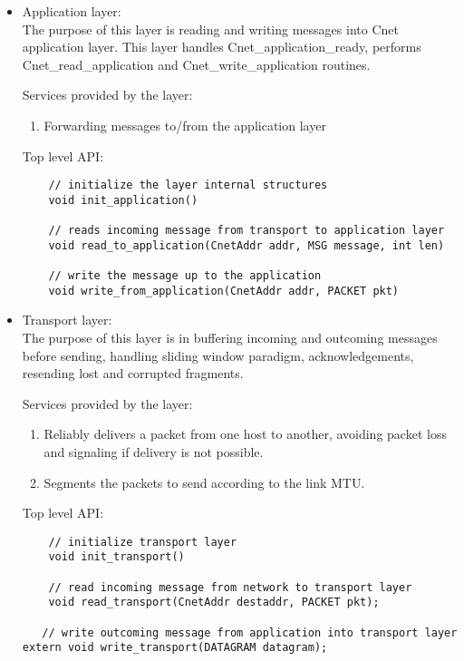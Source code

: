 \documentclass{article}
\begin{document}
\begin{itemize}
  \item Application layer: \\
		The purpose of this layer is reading and writing messages into Cnet
		application layer. This layer handles Cnet\_application\_ready, performs
		Cnet\_read\_application and Cnet\_write\_application routines.
		
		Services provided by the layer:
		\begin{enumerate}
		  \item Forwarding messages to/from the application layer 
		\end{enumerate}
	
	Top level API:
	\begin{verbatim}
    // initialize the layer internal structures
    void init_application()
		
    // reads incoming message from transport to application layer
    void read_to_application(CnetAddr addr, MSG message, int len) 
    
    // write the message up to the application
    void write_from_application(CnetAddr addr, PACKET pkt)    
	\end{verbatim}
		
\item	Transport layer: \\
		The purpose of this layer is in buffering incoming and outcoming
		 messages before sending, handling sliding window paradigm, 
		 acknowledgements, resending lost and corrupted fragments.
		
		Services provided by the layer:
    \begin{enumerate}
      \item Reliably delivers a packet from one host to another, avoiding
       packet loss and signaling if delivery is not possible.
      \item Segments the packets to send according to the link MTU.
    \end{enumerate}
		
		Top level API:
  \begin{verbatim}
    // initialize transport layer
    void init_transport()
		
    // read incoming message from network to transport layer
    void read_transport(CnetAddr destaddr, PACKET pkt);
    
   // write outcoming message from application into transport layer
extern void write_transport(DATAGRAM datagram);
		

\end{verbatim}
\end{itemize}
\end{document}
